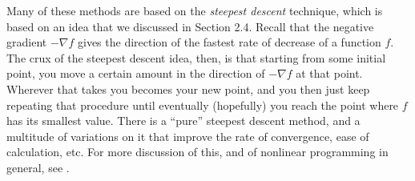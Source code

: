 Many of these methods are based on the \emph{steepest
descent} technique, which is based on an idea that we discussed in Section 2.4. Recall that the negative gradient
$-\nabla f$ gives the direction of the fastest rate of decrease of a function $f$. 
The crux of the steepest descent idea, then, is that starting from some initial point, you move a certain amount in the direction of $-\nabla f$ at that point. 
Wherever that takes you becomes your new point, and you then just keep repeating that procedure until
eventually (hopefully) you reach the point where $f$ has its smallest value. There is a ``pure'' steepest descent
method, and a multitude of variations on it that improve the rate of convergence, ease of calculation, etc. 
For more discussion of this, and of nonlinear programming in general, see \cite{bss}.
\startexercises\label{sec2dot6}
\smallskip
